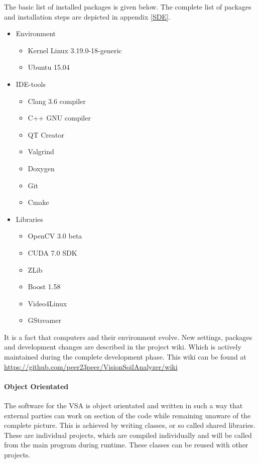 \documentclass[11pt,fleqn,,a4paper,twoside,openright]{book}
\begin{document}
The basic list of installed packages is given below. The complete list of packages and installation steps are depicted in appendix \ref{SDE}.
\begin{itemize}
	\item Environment
	\begin{itemize}
		\item Kernel Linux 3.19.0-18-generic
		\item Ubuntu 15.04
	\end{itemize}
	\item IDE-tools
	\begin{itemize}
		\item Clang 3.6 compiler
		\item C++ GNU compiler
		\item QT Creator
		\item Valgrind
		\item Doxygen
		\item Git
		\item Cmake
	\end{itemize}
	\item Libraries
	\begin{itemize}
		\item OpenCV 3.0 beta
		\item CUDA 7.0 SDK
		\item ZLib
		\item Boost 1.58
		\item Video4Linux
		\item GStreamer
	\end{itemize}
\end{itemize}

 \begin{remark}
 	It is a fact that computers and their environment evolve. New settings, packages and development changes are described in the project wiki. Which is actively maintained during the complete development phase. This wiki can be found at \url{https://github.com/peer23peer/VisionSoilAnalyzer/wiki}
 \end{remark}

\paragraph{Object Orientated}
The software for the VSA is object orientated and written in such a way that external parties can work on section of the code while remaining unaware of the complete picture. This is achieved by writing classes, or so called shared libraries. These are individual projects, which are compiled individually and will be called from the main program during runtime. These classes can be reused with other projects.
\end{document}
